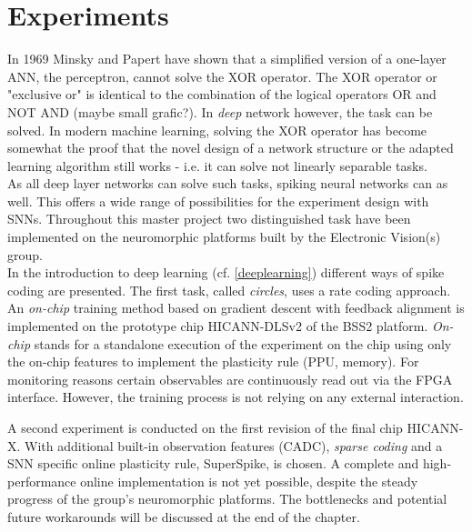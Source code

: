 \chapter{Experiments}
In 1969 Minsky and Papert have shown that a simplified version of a one-layer ANN, the perceptron, cannot solve the XOR operator. The XOR operator or "exclusive or" is identical to the combination of the logical operators OR and NOT AND (maybe small grafic?). In \textit{deep} network however, the task can be solved. In modern machine learning, solving the XOR operator has become somewhat the proof that the novel design of a network structure or the adapted learning algorithm still works - i.e. it can solve not linearly separable tasks.\\

As all deep layer networks can solve such tasks, spiking neural networks can as well. This offers a wide range of possibilities for the experiment design with SNNs. Throughout this master project two distinguished task have been implemented on the neuromorphic platforms built by the Electronic Vision(s) group.\\


In the introduction to deep learning (cf. \ref{deeplearning}) different ways of spike coding are presented. The first task, called \textit{circles}, uses a rate coding approach. An \textit{on-chip} training method based on gradient descent with feedback alignment is implemented on the prototype chip HICANN-DLSv2 of the BSS2 platform. \textit{On-chip} stands for a standalone execution of the experiment on the chip using only the on-chip features to implement the plasticity rule (PPU, memory). For monitoring reasons certain observables are continuously read out via the FPGA interface. However, the training process is not relying on any external interaction.

A second experiment is conducted on the first revision of the final chip HICANN-X. With additional built-in observation features (CADC), \textit{sparse coding} and a SNN specific online plasticity rule, SuperSpike, is chosen. A complete and high-performance online implementation is not yet possible, despite the steady progress of the group's neuromorphic platforms. The bottlenecks and potential future workarounds will be discussed at the end of the chapter.\\



\newpage


